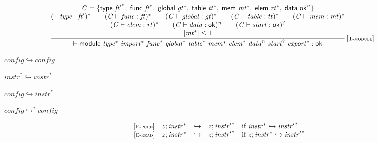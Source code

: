 $$
\begin{array}{@{}c@{}}\displaystyle
\frac{
\begin{array}{@{}c@{}}
{\mathit{C}} = \{ \begin{array}[t]{@{}l@{}}
\mathsf{type}~{{\mathit{ft}'}^\ast},\; \mathsf{func}~{{\mathit{ft}}^\ast},\; \mathsf{global}~{{\mathit{gt}}^\ast},\; \mathsf{table}~{{\mathit{tt}}^\ast},\; \mathsf{mem}~{{\mathit{mt}}^\ast},\; \mathsf{elem}~{{\mathit{rt}}^\ast},\; \mathsf{data}~{\mathsf{ok}^{{\mathit{n}}}} \}\end{array}
 \\
({ \vdash }\;{\mathit{type}} : {\mathit{ft}'})^\ast
 \qquad
({\mathit{C}} \vdash {\mathit{func}} : {\mathit{ft}})^\ast
 \qquad
({\mathit{C}} \vdash {\mathit{global}} : {\mathit{gt}})^\ast
 \qquad
({\mathit{C}} \vdash {\mathit{table}} : {\mathit{tt}})^\ast
 \qquad
({\mathit{C}} \vdash {\mathit{mem}} : {\mathit{mt}})^\ast
 \\
({\mathit{C}} \vdash {\mathit{elem}} : {\mathit{rt}})^\ast
 \qquad
({\mathit{C}} \vdash {\mathit{data}} : \mathsf{ok})^{{\mathit{n}}}
 \qquad
({\mathit{C}} \vdash {\mathit{start}} : \mathsf{ok})^?
 \\
{|{{\mathit{mt}}^\ast}|} \leq 1
\end{array}
}{
{ \vdash }\;\mathsf{module}~{{\mathit{type}}^\ast}~{{\mathit{import}}^\ast}~{{\mathit{func}}^\ast}~{{\mathit{global}}^\ast}~{{\mathit{table}}^\ast}~{{\mathit{mem}}^\ast}~{{\mathit{elem}}^\ast}~{{\mathit{data}}^{{\mathit{n}}}}~{{\mathit{start}}^?}~{{\mathit{export}}^\ast} : \mathsf{ok}
} \, {[\textsc{\scriptsize T{-}module}]}
\qquad
\end{array}
$$

$\boxed{{\mathit{config}} \hookrightarrow {\mathit{config}}}$

$\boxed{{{\mathit{instr}}^\ast} \hookrightarrow {{\mathit{instr}}^\ast}}$

$\boxed{{\mathit{config}} \hookrightarrow {{\mathit{instr}}^\ast}}$

$\boxed{{\mathit{config}} \hookrightarrow^\ast {\mathit{config}}}$

$$
\begin{array}{@{}l@{}lcl@{}l@{}}
{[\textsc{\scriptsize E{-}pure}]} \quad & {\mathit{z}} ; {{\mathit{instr}}^\ast} &\hookrightarrow& {\mathit{z}} ; {{\mathit{instr}'}^\ast} &\quad
  \mbox{if}~{{\mathit{instr}}^\ast} \hookrightarrow {{\mathit{instr}'}^\ast} \\
{[\textsc{\scriptsize E{-}read}]} \quad & {\mathit{z}} ; {{\mathit{instr}}^\ast} &\hookrightarrow& {\mathit{z}} ; {{\mathit{instr}'}^\ast} &\quad
  \mbox{if}~{\mathit{z}} ; {{\mathit{instr}}^\ast} \hookrightarrow {{\mathit{instr}'}^\ast} \\
\end{array}
$$

